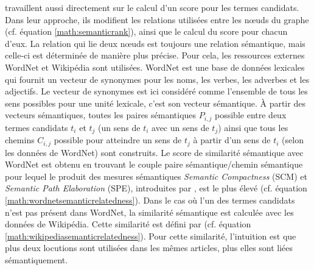           \citet{tsatsaronis2010semanticrank} travaillent aussi directement sur le
          calcul d'un score pour les termes candidats. Dans leur approche, ils modifient les
          relations utilisées entre les n\oe{}uds du graphe (cf. équation
          \ref{math:semanticrank}), ainsi que le calcul du score pour chacun d'eux.
          La relation qui lie deux n\oe{}uds est toujours une relation sémantique,
          mais celle-ci est déterminée de manière plus précise. Pour cela, les
          ressources externes WordNet \citep{fellbaum2010wordnet} et Wikipédia sont
          utilisées. WordNet est une base de données lexicales qui fournit un
          vecteur de synonymes pour les noms, les verbes, les adverbes et les
          adjectifs. Le vecteur de synonymes est ici considéré comme l'ensemble de
          tous les sens possibles pour une unité lexicale, c'est son vecteur
          sémantique. À partir des vecteurs sémantiques, toutes les paires
          sémantiques $P_{i, j}$ possible entre deux termes candidats $t_i$ et $t_j$ (un sens
          de $t_i$ avec un sens de $t_j$) ainsi que tous les chemins $C_{i, j}$
          possible pour atteindre un sens de $t_j$ à partir d'un sens de $t_i$
          (selon les données de WordNet) sont construits. Le score de similarité
          sémantique avec WordNet est obtenu en trouvant le couple paire
          sémantique/chemin sémantique pour lequel le produit des mesures
          sémantiques \textit{Semantic Compactness} (SCM) et \textit{Semantic Path
          Elaboration} (SPE), introduites par
          \citet{tsatsaronis2010textrelatedness}, est le plus élevé (cf. équation
          \ref{math:wordnetsemanticrelatedness}). Dans le cas où l'un des termes candidats
          n'est pas présent dans WordNet, la similarité sémantique est calculée avec
          les données de Wikipédia. Cette similarité est défini par
          \citet{milne2008wikipediasemanticrelatedness} (cf. équation
          \ref{math:wikipediasemanticrelatedness}). Pour cette similarité,
          l'intuition est que plus deux locutions sont utilisées dans les mêmes
          articles, plus elles sont liées sémantiquement.
